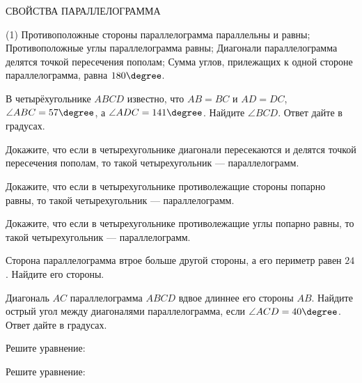 \begin{class}[number=5]
	\begin{center}
		СВОЙСТВА ПАРАЛЛЕЛОГРАММА 
	\end{center}
	\begin{tasks}(1)
		\task Противоположные стороны параллелограмма параллельны и равны;
		\task Противоположные углы параллелограмма равны;
		\task Диагонали параллелограмма делятся точкой пересечения пополам;
		\task Сумма углов, прилежащих к одной стороне параллелограмма, равна \( 180\degree \).
	\end{tasks}
	\begin{listofex}
		\item В четырёхугольнике \( ABCD \) известно, что \( AB=BC \) и \( AD=DC \),
		\( \angle ABC = 57\degree \), а \( \angle ADC = 141\degree \). Найдите \( \angle BCD \). Ответ дайте в градусах.
		\item Докажите, что если в четырехугольнике диагонали пересекаются и делятся точкой пересечения пополам,
		то такой четырехугольник --- параллелограмм.
		\item Докажите, что если в четырехугольнике противолежащие стороны попарно равны, то такой четырехугольник --- параллелограмм.
		\item Докажите, что если в четырехугольнике противолежащие углы попарно равны, то такой четырехугольник --- параллелограмм.
		\item Сторона параллелограмма втрое больше другой стороны, а его периметр равен \( 24 \). Найдите его стороны.
		\item Диагональ \( AC \) параллелограмма \( ABCD \) вдвое длиннее его стороны \( AB \).
		Найдите острый угол между диагоналями параллелограмма, если \( \angle ACD=40\degree \).
		Ответ дайте в градусах.
		\item Решите уравнение:
		\begin{itasks}[4]
			\task {}
			\task {}
			\task {}
			\task {}
		\end{itasks}
		\item Решите уравнение:
		\begin{itasks}[2]
			\task {}
			\task {}
		\end{itasks}
	\end{listofex}
\end{class}
